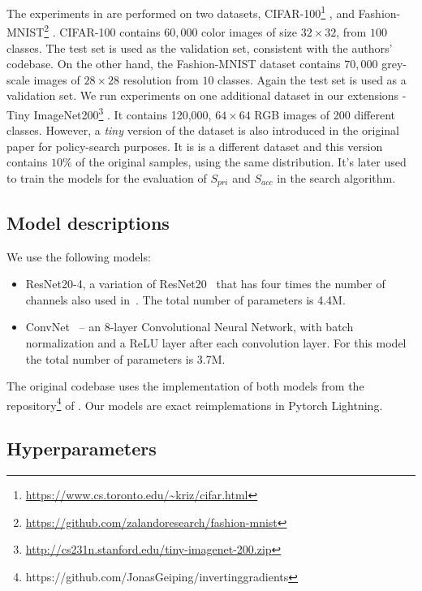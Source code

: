 The experiments in \cite{gao2021privacy} are performed on two datasets, CIFAR-100\footnote{\url{https://www.cs.toronto.edu/~kriz/cifar.html}} \cite{krizhevsky2009learning}, and Fashion-MNIST\footnote{\url{https://github.com/zalandoresearch/fashion-mnist}} \cite{xiao2017fashionmnist}. CIFAR-100 contains $60,000$ color images of size $32\times32$, from $100$ classes. The test set is used as the validation set, consistent with the authors' codebase.
On the other hand, the Fashion-MNIST dataset contains $70,000$  grey-scale images of $28\times28$ resolution from $10$ classes. Again the test set is used as a validation set. We run experiments on one additional dataset in our extensions - Tiny ImageNet200\footnote{\url{http://cs231n.stanford.edu/tiny-imagenet-200.zip}} \cite{imagenet_cvpr09}. It contains 120,000, $64\times64$ RGB images of 200 different classes. However, a \emph{tiny} version of the dataset is also introduced in the original paper for policy-search purposes. It is is a different dataset and this version contains $10\%$ of the original samples, using the same distribution. It's later used to train the models for the evaluation of $S_{pri}$ and $S_{acc}$ in the search algorithm.

\subsection{Model descriptions}

We use the following models:

\begin{itemize}[noitemsep]
    \item ResNet20-4, a variation of ResNet20~\cite{he2016deep} that has four times the number of channels also used in~\cite{geiping2020inverting}. The total number of parameters is 4.4M.
    \item ConvNet~\cite{geiping2020inverting} -- an 8-layer Convolutional Neural Network, with batch normalization and a ReLU layer after each convolution layer. For this model the total number of parameters is 3.7M.
\end{itemize}

The original codebase uses the implementation of both models from the repository\footnote{https://github.com/JonasGeiping/invertinggradients} of \cite{geiping2020inverting}. Our models are exact reimplemations in Pytorch Lightning.

\subsection{Hyperparameters}

